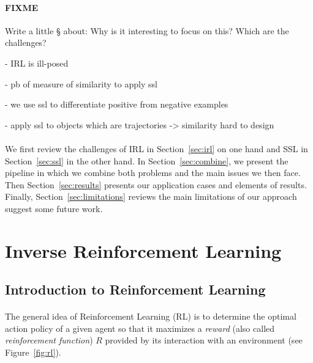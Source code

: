 \documentclass{article}
\begin{document}
\paragraph{FIXME} %
Write a little § about:
Why is it interesting to focus on this?
Which are the challenges?

 - IRL is ill-posed

 - pb of measure of similarity to apply ssl
 
 - we use ssl to differentiate positive from negative examples

 - apply ssl to objects which are trajectories -> similarity hard to design

\paragraph{}
We first review the challenges of IRL in Section~\ref{sec:irl} on one hand and SSL in Section~\ref{sec:ssl} in the other hand. In Section~\ref{sec:combine}, we present the pipeline in which we combine both problems and the main issues we then face. Then Section~\ref{sec:results} presents our application cases and elements of results. Finally, Section~\ref{sec:limitations} reviews the main limitations of our approach suggest some future work.


\section{Inverse Reinforcement Learning \label{sec:irl}}

\subsection{Introduction to Reinforcement Learning}

\paragraph{}
The general idea of Reinforcement Learning (RL) \cite{Sutton98} is to determine the optimal action policy of a given agent so that it maximizes a \emph{reward} (also called \emph{reinforcement function}) $R$ provided by its interaction with an environment (see Figure~\ref{fig:rl}).
\end{document}
